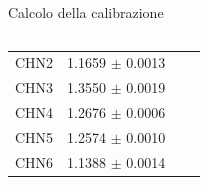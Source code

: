 \documentclass [xcolor=svgnames] {beamer}
\begin{document}
\begin{frame}{Calcolo della calibrazione}
\begin{columns}
\begin{column}{0.45\textwidth}
{\begin{table}[ht]
{\begin{tabular}{@{}cccc@{}}
							CHN2 & 1.1659 \(\pm\) 0.0013 \\
							CHN3 & 1.3550 \(\pm\) 0.0019 \\
							CHN4 & 1.2676 \(\pm\) 0.0006 \\
							CHN5 & 1.2574 \(\pm\) 0.0010 \\
							CHN6 & 1.1388 \(\pm\) 0.0014 \\
							\bottomrule
					\end{tabular}}
			\end{table}}
		\end{column}
	\end{columns}
\end{frame}
\end{document}
